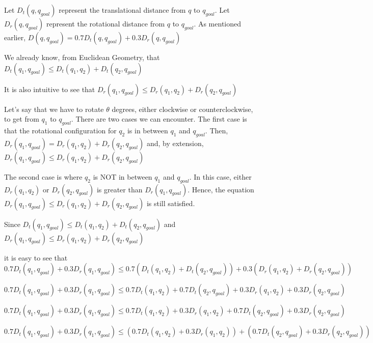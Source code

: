 \documentclass{article}
\begin{document}
Let $D_t(q, q_{goal})$ represent the translational distance from $q$ to $q_{goal}$. Let $D_r(q, q_{goal})$ represent the rotational distance from $q$ to $q_{goal}$. As mentioned earlier, $D(q, q_{goal}) = 0.7D_t(q, q_{goal}) + 0.3D_r(q, q_{goal})$ \newline 

We already know, from Euclidean Geometry, that $D_t(q_1, q_{goal}) \leq D_t(q_1, q_2) + D_t(q_2, q_{goal})$ \newline 


It is also intuitive to see that 
$D_r(q_1, q_{goal}) \leq D_r(q_1, q_2) + D_r(q_2, q_{goal})$ \newline 

Let's say that we have to rotate $\theta$ degrees, either clockwise or counterclockwise, to get from $q_1$ to $q_{goal}$. There are two cases we can encounter. The first case is that the rotational configuration for $q_2$ is in between $q_1$ and $q_{goal}$. Then,  $D_r(q_1, q_{goal}) = D_r(q_1, q_2) + D_r(q_2, q_{goal})$ and, by extension, $D_r(q_1, q_{goal}) \leq D_r(q_1, q_2) + D_r(q_2, q_{goal})$ \newline 


The second case is where $q_{2}$ is NOT in between $q_{1}$ and $q_{goal}$. In this case, either $D_r(q_1, q_2)$ or $D_r(q_2, q_{goal})$ is greater than $D_r(q_1, q_{goal})$. Hence, the equation $D_r(q_1, q_{goal}) \leq D_r(q_1, q_2) + D_r(q_2, q_{goal})$ is still satisfied. \newline 

Since $D_t(q_1, q_{goal}) \leq D_t(q_1, q_2) + D_t(q_2, q_{goal})$ and $D_r(q_1, q_{goal}) \leq D_r(q_1, q_2) + D_r(q_2, q_{goal})$ \newline 

it is easy to see that $0.7 D_t(q_1, q_{goal}) + 0.3 D_r(q_1, q_{goal}) \leq 0.7(D_t(q_1, q_2) + D_t(q_2, q_{goal})) + 0.3(D_r(q_1, q_2) + D_r(q_2, q_{goal}))$ \newline 

$0.7 D_t(q_1, q_{goal}) + 0.3 D_r(q_1, q_{goal}) \leq 0.7D_t(q_1, q_2) + 0.7D_t(q_2, q_{goal}) + 0.3D_r(q_1, q_2) + 0.3D_r(q_2, q_{goal})$ \newline 

$0.7 D_t(q_1, q_{goal}) + 0.3 D_r(q_1, q_{goal}) \leq 0.7D_t(q_1, q_2) + 0.3D_r(q_1, q_2) + 0.7D_t(q_2, q_{goal}) + 0.3D_r(q_2, q_{goal})$ \newline 

$0.7 D_t(q_1, q_{goal}) + 0.3 D_r(q_1, q_{goal}) \leq (0.7D_t(q_1, q_2) + 0.3D_r(q_1, q_2)) + (0.7D_t(q_2, q_{goal}) + 0.3D_r(q_2, q_{goal}))$ \newline 
\end{document}
